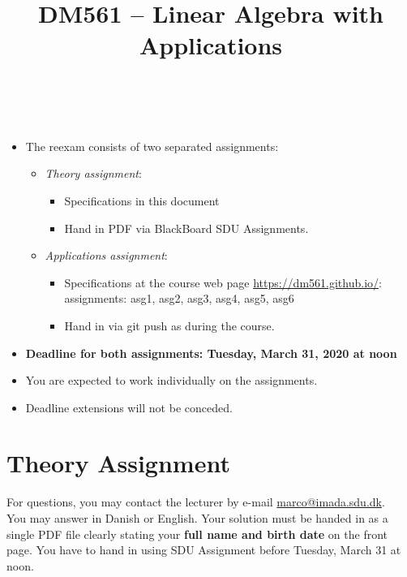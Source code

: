 \documentclass[a4paper,10pt]{article}
\title{%
\begin{flushleft}
DM561 -- Linear Algebra with Applications\\[0.3cm]
\hrulefill
\\[-1.8cm]
\end{flushleft}
}
\author{}
\date{}
\begin{document}
\maketitle




\medskip

\begin{itemize}

\itemsep=1ex

\item The reexam consists of two separated assignments:

\begin{itemize}

\item \emph{Theory assignment}:
  \begin{itemize}
\item Specifications in this document
\item Hand in PDF via BlackBoard SDU Assignments.
  \end{itemize}
  
\item \emph{Applications assignment}:
  \begin{itemize}
  \item Specifications at the course web page
    \url{https://dm561.github.io/}:\\ assignments: asg1, asg2, asg3, asg4,
    asg5, asg6
  \item Hand in via git push as during the course.
  \end{itemize}
\end{itemize}
  
\item {\bf Deadline for both assignments: Tuesday, March 31, 2020 at noon}

\item You are expected to work individually on the assignments.

  
\item Deadline extensions will not be conceded.
\end{itemize}


\clearpage

\section*{Theory Assignment}


For questions, you may contact the lecturer by e-mail
\url{marco@imada.sdu.dk}. \\ You may answer in Danish or English. Your
solution must be handed in as a single PDF file clearly stating your
{\bf full name and birth date} on the front page. You have to hand in
using SDU Assignment before Tuesday, March 31 at noon.
\end{document}
